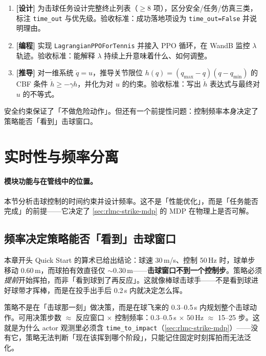 \begin{practice}[本节动手任务]
\begin{enumerate}
  \item \textbf{[设计]} 为击球任务设计完整终止列表（$\ge 8$ 项），区分安全/任务/仿真三类，标注 \verb|time_out| 与优先级。验收标准：成功落地项设为 \verb|time_out=False| 并说明理由。
  \item \textbf{[编程]} 实现 \verb|LagrangianPPOForTennis| 并接入 PPO 循环，在 WandB 监控 $\lambda$ 轨迹。验收标准：能解释 $\lambda$ 持续上升意味着什么、如何调整。
  \item \textbf{[推导]} 对一维系统 $\dot{q}=u$，推导关节限位 $h(q)=(q_{\max}-q)(q-q_{\min})$ 的 CBF 条件 $\dot{h}\ge -\gamma h$，并化为对 $u$ 的约束。验收标准：写出 $\dot h$ 表达式与最终对 $u$ 的不等式。
\end{enumerate}
\end{practice}

\noindent{}安全约束保证了「不做危险动作」。但还有一个前提性问题：控制频率本身决定了策略能否「看到」击球窗口。

\section{实时性与频率分离}
\label{sec:rlmc-strike-freq}

\paragraph{模块功能与在管线中的位置。}本节分析击球控制的时间约束并设计频率。这不是「性能优化」，而是「任务能否完成」的前提——它决定了 \cref{sec:rlmc-strike-mdp} 的 MDP 在物理上是否可解。

\subsection{频率决定策略能否「看到」击球窗口}

本章开头 Quick Start 的算术已给出结论：球速 30\,m/s、控制 50\,Hz 时，球单步移动 0.60\,m，而球拍有效直径仅 $\sim 0.30$\,m——\textbf{击球窗口不到一个控制步}。策略必须\emph{提前}开始挥拍，而非「看到球到了再反应」。这就像棒球击球手——不是看到球进好球带才挥棒，而是在投手出手后 0.2\,s 内就决定怎么挥。

\begin{insight}[策略在球飞来的零点几秒内规划整套动作]\label{ins:rlmc-strike-plan-ahead}
策略不是在「击球那一刻」做决策，而是在球飞来的 0.3--0.5\,s 内规划整个击球动作。可用决策步数 $\approx$ 反应窗口 $\times$ 控制频率：0.3--0.5\,s $\times$ 50\,Hz $\approx$ 15--25 步。这就是为什么 actor 观测里必须含 \verb|time_to_impact|（\cref{sec:rlmc-strike-mdp}）——没有它，策略无法判断「现在该挥到哪个阶段」，只能记住固定时刻挥拍而无法泛化。
\end{insight}

